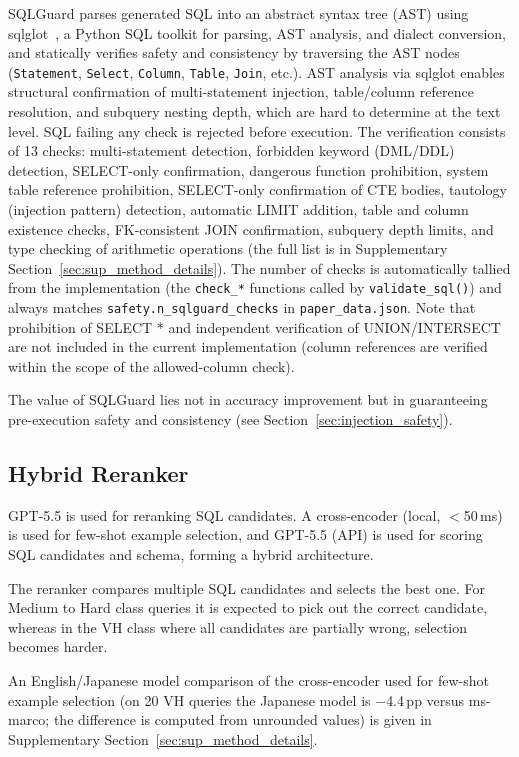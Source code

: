 SQLGuard parses generated SQL into an abstract syntax tree (AST) using sqlglot~\cite{sqlglot2023}, a Python SQL toolkit for parsing, AST analysis, and dialect conversion, and statically verifies safety and consistency by traversing the AST nodes (\texttt{Statement}, \texttt{Select}, \texttt{Column}, \texttt{Table}, \texttt{Join}, etc.). AST analysis via sqlglot enables structural confirmation of multi-statement injection, table/column reference resolution, and subquery nesting depth, which are hard to determine at the text level. SQL failing any check is rejected before execution. The verification consists of 13 checks: multi-statement detection, forbidden keyword (DML/DDL) detection, SELECT-only confirmation, dangerous function prohibition, system table reference prohibition, SELECT-only confirmation of CTE bodies, tautology (injection pattern) detection, automatic LIMIT addition, table and column existence checks, FK-consistent JOIN confirmation, subquery depth limits, and type checking of arithmetic operations (the full list is in Supplementary Section~\ref{sec:sup_method_details}). The number of checks is automatically tallied from the implementation (the \texttt{check\_*} functions called by \texttt{validate\_sql()}) and always matches \texttt{safety.n\_sqlguard\_checks} in \texttt{paper\_data.json}. Note that prohibition of SELECT * and independent verification of UNION/INTERSECT are not included in the current implementation (column references are verified within the scope of the allowed-column check).

The value of SQLGuard lies not in accuracy improvement but in guaranteeing pre-execution safety and consistency (see Section~\ref{sec:injection_safety}).

\subsection{Hybrid Reranker}

GPT-5.5 is used for reranking SQL candidates. A cross-encoder (local, $<$50\,ms) is used for few-shot example selection, and GPT-5.5 (API) is used for scoring SQL candidates and schema, forming a hybrid architecture.

The reranker compares multiple SQL candidates and selects the best one. For Medium to Hard class queries it is expected to pick out the correct candidate, whereas in the VH class where all candidates are partially wrong, selection becomes harder.

An English/Japanese model comparison of the cross-encoder used for few-shot example selection (on 20 VH queries the Japanese model is $-$4.4\,pp versus ms-marco; the difference is computed from unrounded values) is given in Supplementary Section~\ref{sec:sup_method_details}.

